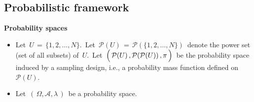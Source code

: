 

\vskip 1.0cm
\subsection{Probabilistic framework}
\label{DomainRatioProbabilisticFramework}
\setcounter{theorem}{0}


\noindent
\textbf{Probability spaces}
\begin{itemize}
\item
    Let
    \,$U \,=\, \{1,2,\ldots,N\}$.\,
    Let
    \,$\mathcal{P}(U) \,=\, \mathcal{P}(\{1,2,\ldots,N\})$\,
    denote the power set (set of all subsets) of \,$U$.\,
    Let
    \,$\left(\,\mathcal{P}(U)\,,\mathcal{P}(\mathcal{P}(U))\,,\overset{{\color{white}-}}{\pi}\,\right)$\,
    be the probability space induced by a sampling design, i.e.,
    a probability mass function defined on
    \,$\mathcal{P}(U)$.\,
\item
    Let \,$\left(\,\Omega,\mathscr{A},\lambda\,\right)$\, be a probability space.
\end{itemize}

